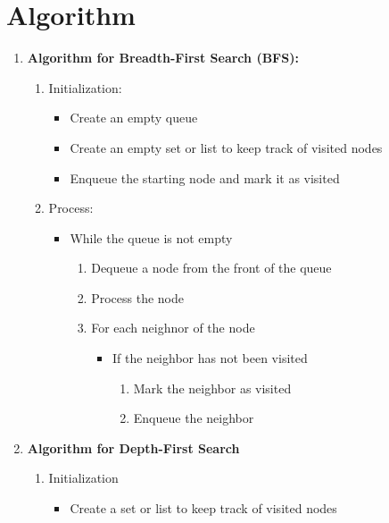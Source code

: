 \documentclass[12pt]{fphw}
\begin{document}
\section{Algorithm}
\begin{enumerate}
  \item \textbf{Algorithm for Breadth-First Search (BFS):}
    \begin{enumerate}
      \item Initialization:
        \begin{itemize}
          \item Create an empty queue
          \item Create an empty set or list to keep track of visited nodes
          \item Enqueue the starting node and mark it as visited
        \end{itemize}
      \item Process:
        \begin{itemize}
          \item While the queue is not empty 
            \begin{enumerate}
              \item Dequeue a node from the front of the queue
              \item Process the node 
              \item For each neighnor of the node
                \begin{itemize}
                  \item If the neighbor has not been visited
                    \begin{enumerate}
                      \item Mark the neighbor as visited
                      \item Enqueue the neighbor
                    \end{enumerate}
                \end{itemize}
            \end{enumerate}
        \end{itemize}
    \end{enumerate}
  \item \textbf{Algorithm for Depth-First Search}
    \begin{enumerate}
      \item Initialization
        \begin{itemize}
          \item Create a set or list to keep track of visited nodes

\end{itemize}
\end{enumerate}
\end{enumerate}
\end{document}
